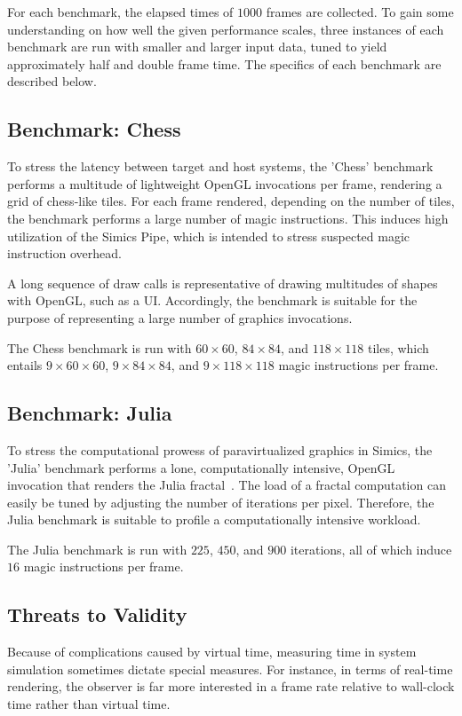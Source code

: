 For each benchmark, the elapsed times of $1000$ frames are collected.
To gain some understanding on how well the given performance scales, three instances of each benchmark are run with smaller and larger input data, tuned to yield approximately half and double frame time.
The specifics of each benchmark are described below.



\subsection{Benchmark: Chess}
To stress the latency between target and host systems, the 'Chess' benchmark performs a multitude of lightweight OpenGL invocations per frame, rendering a grid of chess-like tiles.
For each frame rendered, depending on the number of tiles, the benchmark performs a large number of magic instructions.
This induces high utilization of the Simics Pipe, which is intended to stress suspected magic instruction overhead.

A long sequence of draw calls is representative of drawing multitudes of shapes with OpenGL, such as a UI.
Accordingly, the benchmark is suitable for the purpose of representing a large number of graphics invocations.

The Chess benchmark is run with $60\times60$, $84\times84$, and $118\times118$ tiles, which entails $9\times60\times60$, $9\times84\times84$, and $9\times118\times118$ magic instructions per frame.

\subsection{Benchmark: Julia}
To stress the computational prowess of paravirtualized graphics in Simics, the 'Julia' benchmark performs a lone, computationally intensive, OpenGL invocation that renders the Julia fractal~.
The load of a fractal computation can easily be tuned by adjusting the number of iterations per pixel.
Therefore, the Julia benchmark is suitable to profile a computationally intensive workload. %

The Julia benchmark is run with $225$, $450$, and $900$ iterations, all of which induce $16$ magic instructions per frame.

\subsection{Threats to Validity}
\label{sec:threatstovalidity}
Because of complications caused by virtual time, measuring time in system simulation sometimes dictate special measures.
For instance, in terms of real-time rendering, the observer is far more interested in a frame rate relative to wall-clock time rather than virtual time.

